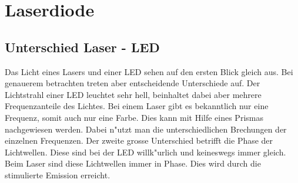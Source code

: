 \begin{refsection}
\begin{flushleft}
\begin{figure}
\end{figure}
\end{flushleft}


%

\section{Laserdiode}
\label{Laserdiode}

\subsection{Unterschied Laser - LED}
\label{Unterschied Laser - LED}
Das Licht eines Lasers und einer LED sehen auf den ersten Blick gleich aus.
Bei genauerem betrachten treten aber entscheidende Unterschiede auf.
Der Lichtstrahl einer LED leuchtet sehr hell, beinhaltet dabei aber mehrere
Frequenzanteile des Lichtes.
Bei einem Laser gibt es bekanntlich nur eine Frequenz,
somit auch nur eine Farbe.
Dies kann mit Hilfe eines Prismas nachgewiesen werden.
Dabei n"utzt man die unterschiedlichen Brechungen der einzelnen Frequenzen.
Der zweite grosse Unterschied betrifft die Phase der Lichtwellen.
Diese sind bei der LED willk"urlich und keineswegs immer gleich.
Beim Laser sind diese Lichtwellen immer in Phase.
Dies wird durch die stimulierte Emission erreicht.


\end{refsection}
